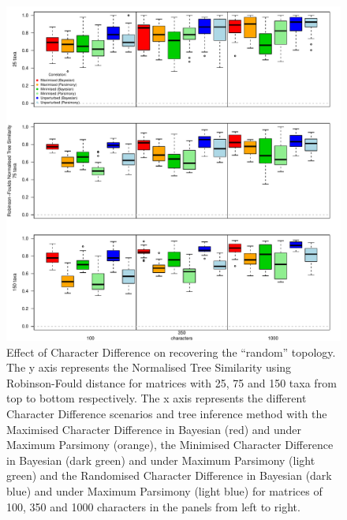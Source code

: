 \documentclass[12pt,letterpaper]{article}
\begin{document}
\begin{figure}[!htbp]
\centering
   \includegraphics[width=1\textwidth]{../Figures/RF_results_null.pdf} %
\caption{Effect of Character Difference on recovering the ``random'' topology. The y axis represents the Normalised Tree Similarity using Robinson-Fould distance for matrices with 25, 75 and 150 taxa from top to bottom respectively. The x axis represents the different Character Difference scenarios and tree inference method with the Maximised Character Difference in Bayesian (red) and under Maximum Parsimony (orange), the Minimised Character Difference in Bayesian (dark green) and under Maximum Parsimony (light green) and the Randomised Character Difference in Bayesian (dark blue) and under Maximum Parsimony (light blue) for matrices of 100, 350 and 1000 characters in the panels from left to right.}
\label{Fig:RF_results_rand}
\end{figure}
\end{document}
